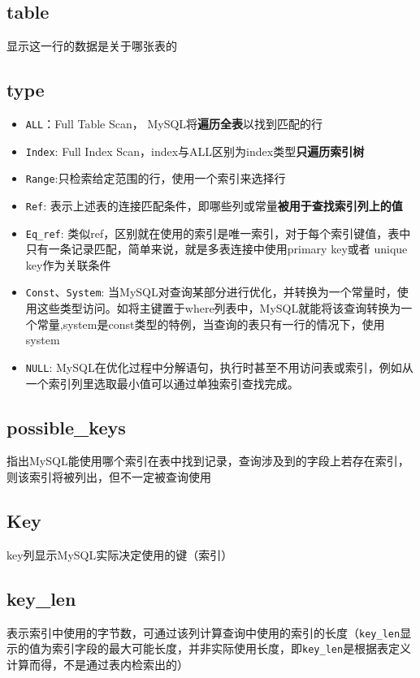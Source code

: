 \documentclass[UTF8,a4paper,12pt]{ctexbook}
\begin{document}
		\subsection{table}	
			显示这一行的数据是关于哪张表的
			
		\subsection{type}
			
			\begin{itemize}
				\item \verb|ALL|：Full Table Scan， MySQL将\textbf{遍历全表}以找到匹配的行
				\item \verb|Index|: Full Index Scan，index与ALL区别为index类型\textbf{只遍历索引树}
				\item \verb|Range|:只检索给定范围的行，使用一个索引来选择行
				\item \verb|Ref|: 表示上述表的连接匹配条件，即哪些列或常量\textbf{被用于查找索引列上的值}
				\item \verb|Eq_ref|: 	类似ref，区别就在使用的索引是唯一索引，对于每个索引键值，表中只有一条记录匹配，简单来说，就是多表连接中使用primary key或者 unique key作为关联条件
				\item \verb|Const|、\verb|System|: 当MySQL对查询某部分进行优化，并转换为一个常量时，使用这些类型访问。如将主键置于where列表中，MySQL就能将该查询转换为一个常量,system是const类型的特例，当查询的表只有一行的情况下，使用system
				\item \verb|NULL|: MySQL在优化过程中分解语句，执行时甚至不用访问表或索引，例如从一个索引列里选取最小值可以通过单独索引查找完成。
			\end{itemize}
			
		\subsection{possible\_keys}
			指出MySQL能使用哪个索引在表中找到记录，查询涉及到的字段上若存在索引，则该索引将被列出，但不一定被查询使用
			
		\subsection{Key}
			key列显示MySQL实际决定使用的键（索引）
			
		\subsection{key\_len}
			表示索引中使用的字节数，可通过该列计算查询中使用的索引的长度（\verb|key_len|显示的值为索引字段的最大可能长度，并非实际使用长度，即\verb|key_len|是根据表定义计算而得，不是通过表内检索出的）
			
\end{document}
